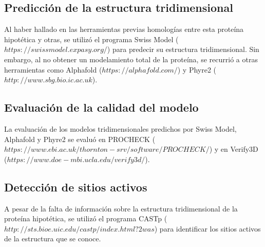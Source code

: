 \documentclass[journal,transmag]{IEEEtran}
\begin{document}
\subsection{\textbf{ Predicción de la estructura tridimensional}}

Al haber hallado en las herramientas previas homologías entre esta proteína hipotética y otras, se utilizó el programa Swiss Model ($https://swissmodel.expasy.org/$) para predecir su estructura tridimensional. Sin embargo, al no obtener un modelamiento total de la proteína, se recurrió a otras herramientas como Alphafold ($https://alphafold.com/$) y Phyre2 ($http://www.sbg.bio.ic.ac.uk$).

\subsection{\textbf{ Evaluación de la calidad del modelo}}

La evaluación de los modelos tridimensionales predichos por Swiss Model, Alphafold y Phyre2 se evaluó en PROCHECK ($https://www.ebi.ac.uk/thornton-srv/software/PROCHECK/$) y en Verify3D ($https://www.doe-mbi.ucla.edu/verify3d/$). 

\subsection{\textbf{ Detección de sitios activos}}

A pesar de la falta de información sobre la estructura tridimensional de la proteína hipotética, se utilizó el programa CASTp ($http://sts.bioe.uic.edu/castp/index.html?2was$) para identificar los sitios activos de la estructura que se conoce. 
\end{document}
